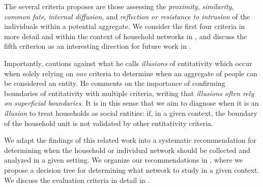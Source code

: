 The several criteria \citeauthor{campbell1958common} proposes are those assessing the \textit{proximity}, \textit{similarity}, \textit{common fate}, \textit{internal diffusion}, and \textit{reflection or resistance to intrusion} of the individuals within a potential aggregate. We consider the first four criteria in more detail and within the context of household networks in , and discuss the fifth criterion as an interesting direction for future work in .


Importantly, \citeauthor{campbell1958common} cautions against what he calls \textit{illusions} of entitativity which occur when solely relying on \textit{one} criteria to determine when an aggregate of people can be considered an entity. He comments on the importance of confirming boundaries of entitativity with multiple criteria, writing that \textit{illusions often rely on superficial boundaries.} It is in this sense that we aim to diagnose when it is an \textit{illusion} to treat households as social entities: if, in a given context, the boundary of the household unit is not validated by other entitativity criteria. 


We adapt the findings of this related work into a systematic recommendation for determining when the household or individual network should be collected and analyzed in a given setting. We organize our recommendations in  , where we propose a decision tree for determining what network to study in a given context. We discuss the evaluation criteria in detail in .